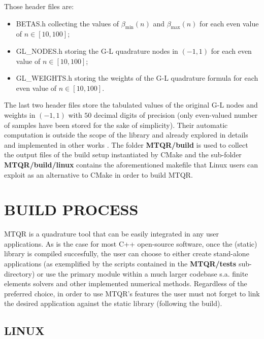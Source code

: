 \documentclass[a4paper, twosided]{book}
\begin{document}
\noindent 
 Those header files are:
\begin{itemize}
    \item \colorbox{poliGrayBlue}{BETAS.h} collecting the values of $\beta_{\text{min}}(n)$ and $\beta_{\text{max}}(n)$ for each even value of $n\in[10,100]$;
    \item \colorbox{poliGrayBlue}{GL\_NODES.h} storing the G-L quadrature nodes in $(-1,1)$ for each even value of $n\in[10,100]$;
    \item \colorbox{poliGrayBlue}{GL\_WEIGHTS.h} storing the weights of the G-L quadrature formula for each even value of $n\in[10,100]$.
\end{itemize}
The last two header files store the tabulated values of the original G-L nodes and weights in $(-1,1)$ with $50$ decimal digits of precision (only even-valued number of samples have been stored for the sake of simplicity). Their automatic computation is outside the scope of the library and already explored in details and implemented in other works \cite{Gautschi94,Hale13}. The folder \colorbox{poliGrayBlue}{\textbf{MTQR/build}} is used to collect the output files of the build setup instantiated by CMake and the sub-folder \colorbox{poliGrayBlue}{\textbf{MTQR/build/linux}} contains the aforementioned \colorbox{poliGrayBlue}{makefile} that Linux users can exploit as an alternative to CMake in order to build MTQR.

\section[Build process]{\changefont BUILD PROCESS}\label{Sec2.3}

\noindent
MTQR is a quadrature tool that can be easily integrated in any user applications. As is the case for most C++ open-source software, once the (static) library is compiled succesfully, the user can choose to either create stand-alone applications (as exemplified by the scripts contained in the \colorbox{poliGrayBlue}{\textbf{MTQR/tests}} sub-directory) or use the primary module within a much larger codebase s.a. finite elements solvers and other implemented numerical methods. Regardless of the preferred choice, in order to use MTQR's features the user must not forget to link the desired application against the static library (following the build).

\subsection[Linux]{\changefont LINUX}\label{SubSec2.3.1}
\end{document}
